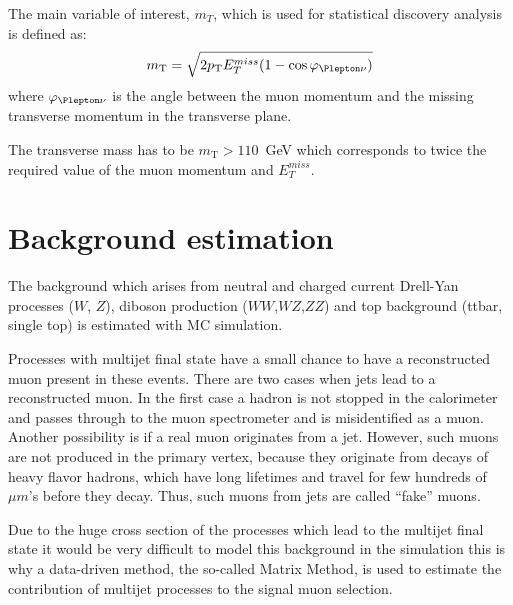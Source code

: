 
The main variable of interest, $m_T$, which is used for statistical discovery analysis is defined as:
\begin{equation}
 m_\mathrm{T} = \sqrt{2 p_\mathrm{T} E_T^{miss} (1-\cos\varphi_{\Plepton\nu})}
\end{equation}
where $\varphi_{\Plepton\nu}$ is the angle between the muon momentum and the missing transverse momentum in the transverse plane.

The transverse mass has to be $m_\mathrm{T} > 110$~GeV which corresponds to twice the required  value of the muon
momentum and $E_T^{miss}$.


\section{Background estimation}
\label{sec:wprime_backgroundEstimation}

The background which arises from neutral and charged current Drell-Yan processes ($W$, $Z$), diboson production ($WW$,$WZ$,$ZZ$) and top background  (ttbar, single top) is estimated with MC simulation.

Processes with multijet final state have a small chance 
to have a reconstructed muon present in these events.
There are two cases when jets lead to a reconstructed muon. 
In the first case a hadron is not stopped in the calorimeter and passes through to the muon spectrometer and is misidentified as a muon. Another possibility is if a real muon originates from a jet. However, such muons are not produced in the primary vertex, because they originate from decays of heavy flavor hadrons, which have long lifetimes and travel for few hundreds of $\mu m$'s before they decay.
Thus, such muons from jets are called ``fake'' muons.

Due to the huge cross section of the processes which lead to the multijet final state 
it would be very difficult to model this background in the simulation
this is why a data-driven method,
the so-called Matrix Method, is used to estimate the contribution of multijet processes to the signal muon selection.

